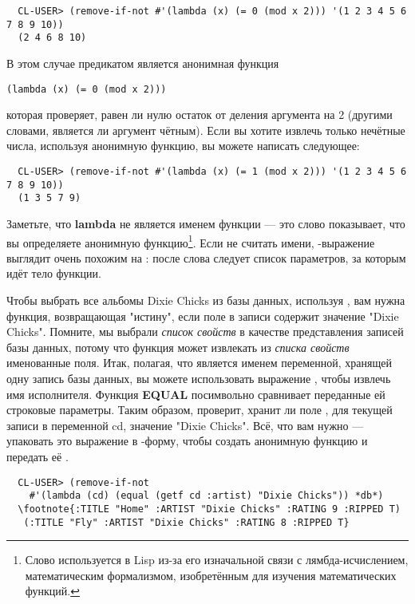\begin{verbatim}
  CL-USER> (remove-if-not #'(lambda (x) (= 0 (mod x 2))) '(1 2 3 4 5 6 7 8 9 10))
  (2 4 6 8 10)
\end{verbatim}

В этом случае предикатом является анонимная функция

\begin{lstlisting}
(lambda (x) (= 0 (mod x 2)))
\end{lstlisting}

которая проверяет, равен ли нулю остаток от деления аргумента на 2 (другими словами,
является ли аргумент чётным). Если вы хотите извлечь только нечётные числа, используя
анонимную функцию, вы можете написать следующее:

\begin{verbatim}
  CL-USER> (remove-if-not #'(lambda (x) (= 1 (mod x 2))) '(1 2 3 4 5 6 7 8 9 10))
  (1 3 5 7 9)
\end{verbatim}

Заметьте, что \textbf{lambda} не является именем функции --- это слово показывает, что вы
определяете анонимную функцию\footnote{Слово  используется в Lisp из-за его
  изначальной связи с лямбда-исчислением, математическим формализмом, изобретённым для
  изучения математических функций.}. Если не считать имени, -выражение
выглядит очень похожим на : после слова  следует список
параметров, за которым идёт тело функции.

Чтобы выбрать все альбомы Dixie Chicks из базы данных, используя , вам
нужна функция, возвращающая "истину", если поле в записи  содержит значение
"Dixie Chicks". Помните, мы выбрали \textit{список свойств} в качестве представления
записей базы данных, потому что функция  может извлекать из \textit{списка
  свойств} именованные поля. Итак, полагая, что  является именем переменной,
хранящей одну запись базы данных, вы можете использовать выражение , чтобы извлечь имя исполнителя. Функция \textbf{EQUAL} посимвольно сравнивает
переданные ей строковые параметры. Таким образом,  проверит, хранит ли поле , для текущей записи в переменной cd,
значение "Dixie Chicks". Всё, что вам нужно --- упаковать это выражение в
-форму, чтобы создать анонимную функцию и передать её .

\begin{verbatim}
  CL-USER> (remove-if-not
    #'(lambda (cd) (equal (getf cd :artist) "Dixie Chicks")) *db*)
  \footnote{:TITLE "Home" :ARTIST "Dixie Chicks" :RATING 9 :RIPPED T)
   (:TITLE "Fly" :ARTIST "Dixie Chicks" :RATING 8 :RIPPED T}
\end{verbatim}

